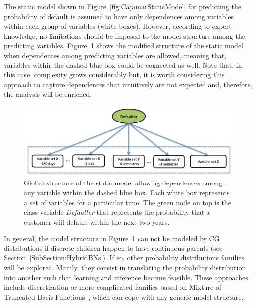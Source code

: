 The static model shown in Figure~\ref{fig:CajamarStaticModel} for predicting the probability of default is assumed to have only dependences among variables within each group of variables (white boxes). However, according to expert knowledge, no limitations should be imposed to the model structure among the predicting variables. Figure~\ref{fig:staticDependences} shows the modified structure of the static model when dependences among predicting variables are allowed, meaning that, variables within the dashed blue box could be connected as well. Note that, in this case, complexity grows considerably but, it is worth considering this approach to capture dependences that intuitively are not expected and, therefore, the analysis will be enriched.

\begin{figure}[ht!]
  \centering
\includegraphics[scale=0.4]{./figures/CajaMarModel3}
\caption{\label{fig:staticDependences}Global structure of the static model allowing dependences among any variable within the dashed blue box. Each white box represents a set of variables for a particular time. The green node on top is the class variable \emph{Defaulter} that represents the probability that a customer will default within the next two years.} 
\end{figure}

In general, the model structure in Figure~\ref{fig:staticDependences} can not be modeled by CG distributions if discrete children happen to have continuous parents (see Section~\ref{SubSection:HybridBNs}). If so, other probability distributions families will be explored. Mainly, they consist in translating the probability distribution into another such that learning and inference become feasible. These approaches include discretization or more complicated families based on Mixture of Truncated Basis Functions~\cite{Langseth12}, which can cope with any generic model structure.

